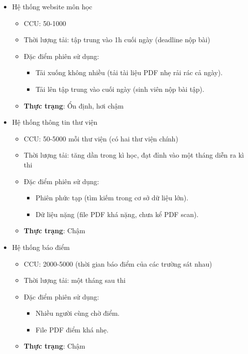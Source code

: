 \documentclass{article}
\begin{document}
\begin{itemize}
    \item Hệ thống website môn học
        \begin{itemize}
            \item CCU: 50-1000
            \item Thời lượng tải: tập trung vào 1h cuối ngày (deadline nộp bài)
            \item Đặc điểm phiên sử dụng:
                \begin{itemize}
                    \item Tải xuống không nhiều (tải tài liệu PDF nhẹ rải rác cả
                    ngày).
                    \item Tải lên tập trung vào cuối ngày (sinh viên nộp bài
                    tập).
                \end{itemize}
            \item \textbf{Thực trạng}: Ổn định, hơi chậm
        \end{itemize}
    \item Hệ thống thông tin thư viện
        \begin{itemize}
            \item CCU: 50-5000 mỗi thư viện (có hai thư viện chính)
            \item Thời lượng tải: tăng dần trong kì học, đạt đỉnh vào một tháng
            diễn ra kì thi
            \item Đặc điểm phiên sử dụng:
                \begin{itemize}
                    \item Phiên phức tạp (tìm kiếm trong cơ sở dữ liệu lớn).
                    \item Dữ liệu nặng (file PDF khá nặng, chưa kể PDF scan).
                \end{itemize}
            \item \textbf{Thực trạng}: Chậm
        \end{itemize}
    \item Hệ thống báo điểm
        \begin{itemize}
            \item CCU: 2000-5000 (thời gian báo điểm của các trường sát nhau)
            \item Thời lượng tải: một tháng sau thi
            \item Đặc điểm phiên sử dụng:
                \begin{itemize}
                    \item Nhiều người cùng chờ điểm.
                    \item File PDF điểm khá nhẹ.
                \end{itemize}
            \item \textbf{Thực trạng}: Chậm
        \end{itemize}
\end{itemize}
\end{document}

